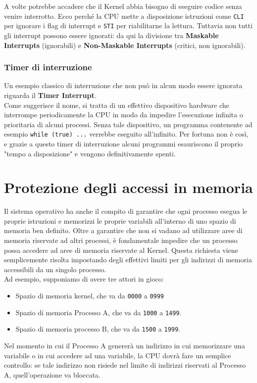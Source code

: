 \documentclass[12pt]{report}
\begin{document}
	A volte potrebbe accadere che il Kernel abbia bisogno di eseguire codice senza venire interrotto. Ecco perché la CPU mette a disposizione istruzioni come \texttt{CLI} per ignorare i flag di interrupt e \texttt{STI} per riabilitarne la lettura.
	Tuttavia non tutti gli interrupt possono essere ignorati: da qui la divisione tra \textbf{Maskable Interrupts} (ignorabili) e \textbf{Non-Maskable Interrupts} (critici, non ignorabili).
	
	\subsubsection{Timer di interruzione}
	Un esempio classico di interruzione che non può in alcun modo essere ignorata riguarda il \textbf{Timer Interrupt}.\\
	Come suggerisce il nome, si tratta di un effettivo dispositivo hardware che interrompe periodicamente la CPU in modo da impedire l'esecuzione infinita o prioritaria di alcuni processi.
	Senza tale dispositivo, un programma contenente ad esempio \texttt{while (true) {...}} verrebbe eseguito all'infinito. Per fortuna non è così, e grazie a questo timer di interruzione alcuni programmi esauriscono il proprio "tempo a disposizione" e vengono definitivamente spenti.
	
	\section{Protezione degli accessi in memoria}
	Il sistema operativo ha anche il compito di garantire che ogni processo esegua le proprie istruzioni e memorizzi le proprie variabili all'interno di uno spazio di memoria ben definito.
	Oltre a garantire che non si vadano ad utilizzare aree di memoria riservate ad altri processi, è fondamentale impedire che un processo possa accedere ad aree di memoria riservate al Kernel.
	\smallbreak
	Questa richiesta viene semplicemente risolta impostando degli effettivi limiti per gli indirizzi di memoria accessibili da un singolo processo.\\
	Ad esempio, supponiamo di avere tre attori in gioco:
	\begin{itemize}
		\item Spazio di memoria kernel, che va da \texttt{0000} a \texttt{0999}
		
		\item Spazio di memoria Processo A, che va da \texttt{1000} a \texttt{1499}.
		
		\item Spazio di memoria processo B, che va da \texttt{1500} a \texttt{1999}.
	\end{itemize}
	Nel momento in cui il Processo A genererà un indirizzo in cui memorizzare una variabile o in cui accedere ad una variabile, la CPU dovrà fare un semplice controllo: se tale indirizzo non risiede nel limite di indirizzi riservati al Processo A, quell'operazione va bloccata.
	
\end{document}
